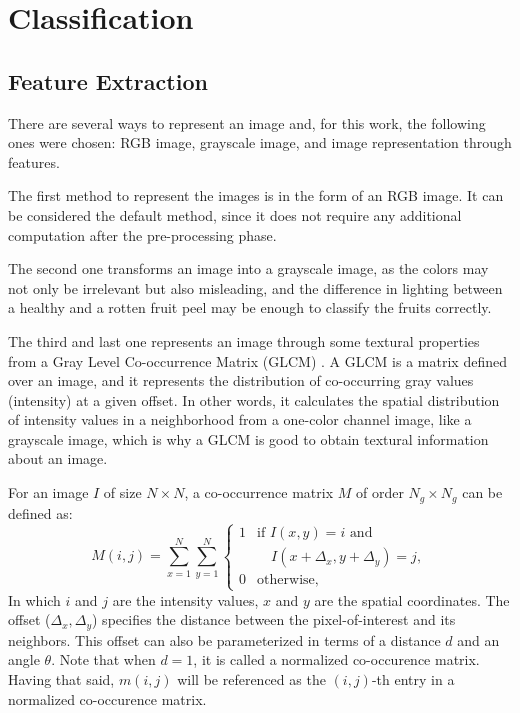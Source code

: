 \documentclass[../main.tex]{subfile}
\begin{document}
\section{Classification} \label{sec:classification}

\subsection{Feature Extraction} \label{subsec:features-extraction}
There are several ways to represent an image and, for this work, the following ones were chosen: RGB image, grayscale image, and image representation through features.

The first method to represent the images is in the form of an RGB image. It can be considered the default method, since it does not require any additional computation after the pre-processing phase.

The second one transforms an image into a grayscale image, as the colors may not only be irrelevant but also misleading, and the difference in lighting between a healthy and a rotten fruit peel may be enough to classify the fruits correctly.

The third and last one represents an image through some textural properties from a Gray Level Co-occurrence Matrix (GLCM) \cite{IV-item1}.
A GLCM is a matrix defined over an image, and it represents the distribution of co-occurring gray values (intensity) at a given offset. In other words, it calculates the spatial distribution of intensity values in a neighborhood from a one-color channel image, like a grayscale image, which is why a GLCM is good to obtain textural information about an image.

For an image $I$ of size $N \times N$, a co-occurrence matrix $M$ of order $N_{g} \times N_{g}$ can be defined as:
\begin{equation}
    M(i,j) = \sum^{N}_{x=1}\sum^{N}_{y=1}
    \begin{cases}
        1 & \mbox{if } I(x,y) = i \mbox{ and }           \\
          & \quad I(x + \Delta_{x}, y + \Delta_{y}) = j, \\
        0 & \mbox{otherwise},
    \end{cases}
\end{equation}
In which $i$ and $j$ are the intensity values, $x$ and $y$ are the spatial coordinates. The offset ($\Delta_{x}, \Delta_{y}$) specifies the distance between the pixel-of-interest and its neighbors. This offset can also be parameterized in terms of a distance $d$ and an angle $\theta$. Note that when $d = 1$, it is called a normalized co-occurence matrix. Having that said, $m(i,j)$ will be referenced as the $(i,j)$-th entry in a normalized co-occurence matrix.
\end{document}
